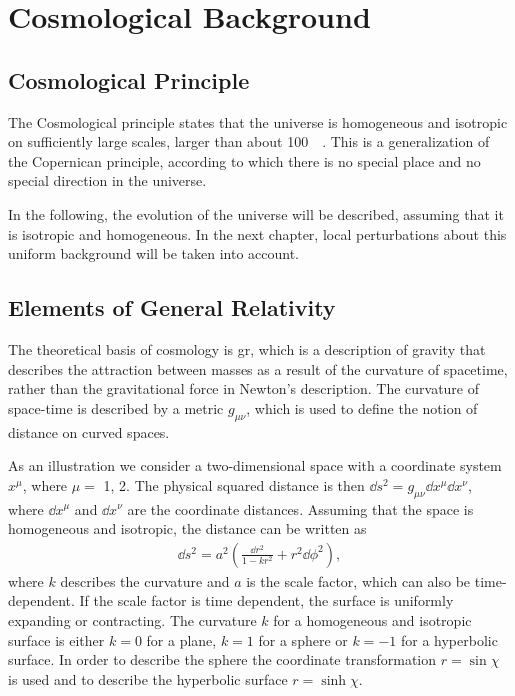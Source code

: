 \chapter{Cosmological Background}

\section{Cosmological Principle}
The Cosmological principle states that the universe is homogeneous and isotropic on sufficiently large scales, larger than about \SI{100}{\mega\parsec}. This is a generalization of the Copernican principle, according to which there is no special place and no special direction in the universe.

In the following, the evolution of the universe will be described, assuming that it is isotropic and homogeneous. In the next chapter, local perturbations about this uniform background will be taken into account.


\section{Elements of General Relativity}
\label{sec:general-relativity}
The theoretical basis of cosmology is \ac{gr}, which is a description of gravity that describes the attraction between masses as a result of the curvature of spacetime, rather than the gravitational force in Newton's description. The curvature of space-time is described by a metric $g_{\mu\nu}$, which is used to define the notion of distance on curved spaces.

As an illustration we consider a two-dimensional space with a coordinate system $x^\mu$, where $\mu =$ 1, 2. The physical squared distance is then $\dd{s}^2 = g_{\mu\nu} \dd{x}^{\mu} \dd{x}^{\nu}$, where $\dd{x}^{\mu}$ and $\dd{x}^{\nu}$ are the coordinate distances. Assuming that the space is homogeneous and isotropic, the distance can be written as
\begin{align*}
	\dd{s}^2 = a^2 \left(\frac{\dd{r}^2}{1-kr^2} + r^2 \dd{\phi}^2\right),
\end{align*}
where $k$ describes the curvature and $a$ is the scale factor, which can also be time-dependent. If the scale factor is time dependent, the surface is uniformly expanding or contracting. The curvature $k$ for a homogeneous and isotropic surface is either $k = 0$ for a plane, $k = 1$ for a sphere or $k = -1$ for a hyperbolic surface. In order to describe the sphere the coordinate transformation $r = \sin\chi$ is used and to describe the hyperbolic surface $r = \sinh\chi$.

